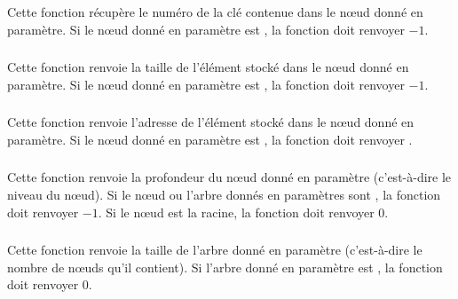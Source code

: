 \noindent Cette fonction récupère le numéro de la clé contenue dans le nœud donné en paramètre.
Si le nœud donné en paramètre est , la fonction doit renvoyer $ -1 $.
%
%
%
%
%

\subsubsection*{}

\noindent Cette fonction renvoie la taille de l'élément stocké dans le nœud donné en paramètre.
Si le nœud donné en paramètre est , la fonction doit renvoyer $ -1 $.

\subsubsection*{}

\noindent Cette fonction renvoie l'adresse de l'élément stocké dans le nœud donné en paramètre.
Si le nœud donné en paramètre est , la fonction doit renvoyer .

\bigskip


\subsubsection*{}

\noindent Cette fonction renvoie la profondeur du nœud donné en paramètre (c'est-à-dire le niveau du nœud).
Si le nœud ou l'arbre donnés en paramètres sont , la fonction doit renvoyer $ -1 $.
Si le nœud est la racine, la fonction doit renvoyer $ 0 $.

\subsubsection*{}

\noindent Cette fonction renvoie la taille de l'arbre donné en paramètre (c'est-à-dire le nombre de nœuds qu'il contient).
Si l'arbre donné en paramètre est , la fonction doit renvoyer $ 0 $.


